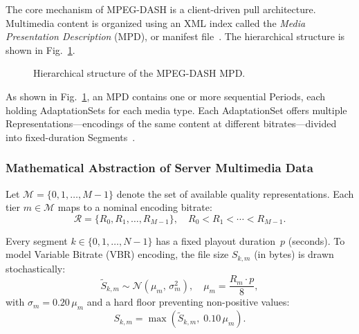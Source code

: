 \documentclass[conference]{IEEEtran}
\begin{document}
The core mechanism of MPEG-DASH is a client-driven pull architecture.
Multimedia content is organized using an XML index called the
\emph{Media Presentation Description} (MPD), or manifest
file~\cite{iso23009}.  The hierarchical structure is shown in
Fig.~\ref{fig:mpd_hierarchy}.

\begin{figure}[t]
\centering
{}
\caption{Hierarchical structure of the MPEG-DASH MPD.}
\label{fig:mpd_hierarchy}
\end{figure}

As shown in Fig.~\ref{fig:mpd_hierarchy}, an MPD contains one or more
sequential Periods, each holding AdaptationSets for each media type.
Each AdaptationSet offers multiple Representations---encodings of the same
content at different bitrates---divided into fixed-duration
Segments~\cite{spiteri2020}.

\subsubsection{Mathematical Abstraction of Server Multimedia Data}

Let $\mathcal{M}=\{0,1,\dots,M{-}1\}$ denote the set of available quality
representations.  Each tier $m\in\mathcal{M}$ maps to a nominal encoding
bitrate:
\begin{equation}
  \mathcal{R}=\{R_0,R_1,\dots,R_{M-1}\}, \quad R_0<R_1<\cdots<R_{M-1}.
\end{equation}

Every segment $k\in\{0,1,\dots,N{-}1\}$ has a fixed playout duration~$p$
(seconds).  To model Variable Bitrate (VBR) encoding, the file size
$S_{k,m}$ (in bytes) is drawn stochastically:
\begin{equation}
  \tilde{S}_{k,m}\sim\mathcal{N}(\mu_m,\,\sigma_m^2),\quad
  \mu_m=\frac{R_m\cdot p}{8},
\end{equation}
with $\sigma_m=0.20\,\mu_m$ and a hard floor preventing non-positive values:
\begin{equation}
  S_{k,m}=\max\!\left(\tilde{S}_{k,m},\;0.10\,\mu_m\right).
\end{equation}
\end{document}
